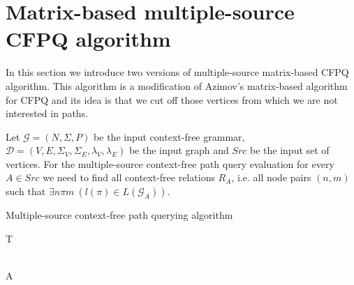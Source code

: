 \section{Matrix-based multiple-source CFPQ algorithm}
\label{sec:multiple-source-algo}
 In this section we introduce two versions of multiple-source matrix-based CFPQ algorithm. This algorithm is a modification of Azimov's matrix-based algorithm for CFPQ and its idea is that we cut off those vertices from which we are not interested in paths.
 
 Let \mbox{$\mathcal{G} = (N, \Sigma, P)$} be the input context-free grammar, $\mathcal{D} = (V, E, \Sigma_V, \Sigma_E, \lambda_V, \lambda_E)$ be the input graph and $Src$ be the input set of vertices. For the multiple-source context-free path query evaluation for every $A \in Src$ we need to find all context-free relations $R_A$, i.e. all node pairs \mbox{$(n,m)$} such that \mbox{$\exists n \pi m~(l(\pi) \in L(\mathcal{G}_A))$}.
\begin{algorithm}
\begin{algorithmic}[1]
\caption{Multiple-source context-free path querying algorithm}
\label{alg:algo1}
    

     
    \EndFor

     
        \EndFor
    \EndFor

     
        \EndFor
    \EndWhile
    \State \Return T
\EndFunction

\\

    \EndFor
    \State \Return A
\EndFunction
\end{algorithmic}
\end{algorithm}
